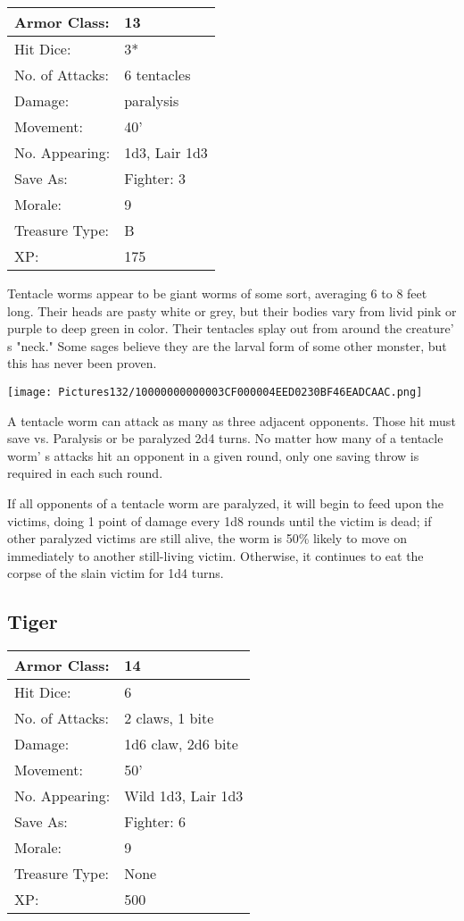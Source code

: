 \documentclass[a4paper,twoside,openany,10pt]{book}
\begin{document}
\begin{multicols}{2}
\begin{tabularx}{0.50\textwidth}{@{}lX@{}}
Armor Class: & 13 \\\hline
Hit Dice: & 3* \\\hline
No. of Attacks: & 6 tentacles \\\hline
Damage: & paralysis \\\hline
Movement: & 40' \\\hline
No. Appearing: & 1d3, Lair 1d3 \\\hline
Save As: & Fighter: 3 \\\hline
Morale: & 9 \\\hline
Treasure Type: & B \\\hline
XP: & 175 \\\hline
\end{tabularx}\medskip

Tentacle worms appear to be giant worms of some sort, averaging 6 to 8 feet long. Their heads are pasty white or grey, but their bodies vary from livid pink or purple to deep green in color. Their tentacles splay out from around the creature' s "neck." Some sages believe they are the larval form of some other monster, but this has never been proven.\medskip

\texttt{[image: Pictures132/10000000000003CF000004EED0230BF46EADCAAC.png]}

A tentacle worm can attack as many as three adjacent opponents. Those hit must save vs. Paralysis or be paralyzed 2d4 turns. No matter how many of a tentacle worm' s attacks hit an opponent in a given round, only one saving throw is required in each such round.

If all opponents of a tentacle worm are paralyzed, it will begin to feed upon the victims, doing 1 point of damage every 1d8 rounds until the victim is dead; if other paralyzed victims are still alive, the worm is 50\% likely to move on immediately to another still-living victim. Otherwise, it continues to eat the corpse of the slain victim for 1d4 turns.

\subsection*{Tiger}\label{tiger}

\begin{tabularx}{0.50\textwidth}{@{}lX@{}}
Armor Class: & 14 \\\hline
Hit Dice: & 6 \\\hline
No. of Attacks: & 2 claws, 1 bite \\\hline
Damage: & 1d6 claw, 2d6 bite \\\hline
Movement: & 50' \\\hline
No. Appearing: & Wild 1d3, Lair 1d3 \\\hline
Save As: & Fighter: 6 \\\hline
Morale: & 9 \\\hline
Treasure Type: & None \\\hline
XP: & 500 \\\hline
\end{tabularx}\medskip



\end{multicols}
\end{document}
